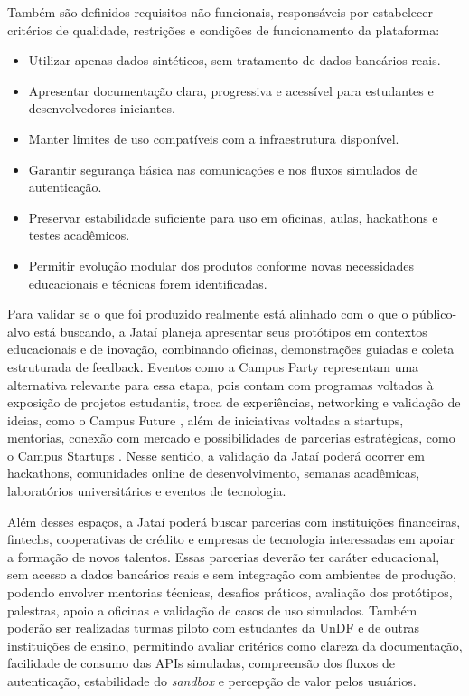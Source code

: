 \documentclass[
  12pt,
  openright,
  oneside,
  a4paper,
  brazilian
]{abntex2}
\begin{document}
Também são definidos requisitos não funcionais, responsáveis por estabelecer critérios de qualidade, restrições e condições de funcionamento da plataforma:

\begin{itemize}
  \item Utilizar apenas dados sintéticos, sem tratamento de dados bancários reais.

  \item Apresentar documentação clara, progressiva e acessível para estudantes e desenvolvedores iniciantes.

  \item Manter limites de uso compatíveis com a infraestrutura disponível.

  \item Garantir segurança básica nas comunicações e nos fluxos simulados de autenticação.

  \item Preservar estabilidade suficiente para uso em oficinas, aulas, hackathons e testes acadêmicos.

  \item Permitir evolução modular dos produtos conforme novas necessidades educacionais e técnicas forem identificadas.
\end{itemize}





Para validar se o que foi produzido realmente está alinhado com o que o público-alvo está buscando, a Jataí planeja apresentar seus protótipos em contextos educacionais e de inovação, combinando oficinas, demonstrações guiadas e coleta estruturada de feedback. Eventos como a Campus Party representam uma alternativa relevante para essa etapa, pois contam com programas voltados à exposição de projetos estudantis, troca de experiências, networking e validação de ideias, como o Campus Future \parencite{campuspartyCampusFuture}, além de iniciativas voltadas a startups, mentorias, conexão com mercado e possibilidades de parcerias estratégicas, como o Campus Startups \parencite{campuspartyCampusStartups}. Nesse sentido, a validação da Jataí poderá ocorrer em hackathons, comunidades online de desenvolvimento, semanas acadêmicas, laboratórios universitários e eventos de tecnologia.

Além desses espaços, a Jataí poderá buscar parcerias com instituições financeiras, fintechs, cooperativas de crédito e empresas de tecnologia interessadas em apoiar a formação de novos talentos. Essas parcerias deverão ter caráter educacional, sem acesso a dados bancários reais e sem integração com ambientes de produção, podendo envolver mentorias técnicas, desafios práticos, avaliação dos protótipos, palestras, apoio a oficinas e validação de casos de uso simulados. Também poderão ser realizadas turmas piloto com estudantes da UnDF e de outras instituições de ensino, permitindo avaliar critérios como clareza da documentação, facilidade de consumo das APIs simuladas, compreensão dos fluxos de autenticação, estabilidade do \textit{sandbox} e percepção de valor pelos usuários.
\end{document}

